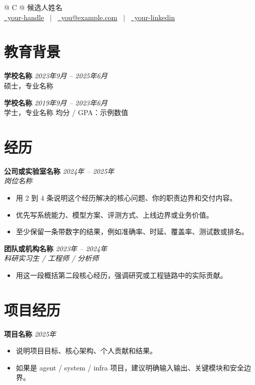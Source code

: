 \documentclass[a4paper,12pt]{article}
\begin{document}
\pagestyle{empty}

\begin{tabularx}{\linewidth}{@{} C @{}}
\Huge{候选人姓名} \\[7.5pt]
\href{https://github.com/your-handle}{\raisebox{-0.05\height}\faGithub\ your-handle} \ $|$ \
\href{mailto:you@example.com}{\raisebox{-0.05\height}\faEnvelope \ you@example.com} \ $|$ \
\href{https://www.linkedin.com/in/your-handle}{\raisebox{-0.05\height}\faLinkedin \ your-linkedin}\\
\end{tabularx}

\section{教育背景}
\textbf{学校名称} \hfill \textit{2023年9月 -- 2025年6月}\\
硕士，专业名称

\textbf{学校名称} \hfill \textit{2019年9月 -- 2023年6月}\\
学士，专业名称 \hfill 均分 / GPA：示例数值

\section{经历}
\textbf{公司或实验室名称} \hfill \textit{2024年 -- 2025年}\\
\textit{岗位名称}
{\small
\begin{itemize}[leftmargin=1.2em,itemsep=2pt,topsep=3pt]
  \item 用 2 到 4 条说明这个经历解决的核心问题、你的职责边界和交付内容。
  \item 优先写系统能力、模型方案、评测方式、上线边界或业务价值。
  \item 至少保留一条带数字的结果，例如准确率、时延、覆盖率、测试数或排名。
\end{itemize}
}

\textbf{团队或机构名称} \hfill \textit{2023年 -- 2024年}\\
\textit{科研实习生 / 工程师 / 分析师}
{\small
\begin{itemize}[leftmargin=1.2em,itemsep=2pt,topsep=3pt]
  \item 用这一段概括第二段核心经历，强调研究或工程链路中的实际贡献。
\end{itemize}
}

\section{项目经历}
\textbf{项目名称} \hfill \textit{2025年}\\
{\small
\begin{itemize}[leftmargin=1.2em,itemsep=2pt,topsep=3pt]
  \item 说明项目目标、核心架构、个人贡献和结果。
  \item 如果是 agent / system / infra 项目，建议明确输入输出、关键模块和安全边界。
\end{itemize}
}
\end{document}
